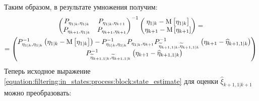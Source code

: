 Таким образом, в результате умножения получим:
\begin{multline*}
	\begin{pmatrix}
		P_{\eta_{1|k}, \eta_{1|k}} & P_{\eta_{1|k}, \eta_{k+1}} \\
		P_{\eta_{k+1}, \eta_{1|k}} & P_{\eta_{k+1}, \eta_{k+1}}
	\end{pmatrix}^{-1}
	\begin{pmatrix}
		\eta_{1|k} - \mathrm{M} \left [ \eta_{1|k} \right ] \\
		\eta_{k+1} - \mathrm{M} \left [ \eta_{k+1} \right ]
	\end{pmatrix}
	= \\
	=
	\begin{pmatrix}
		P_{\eta_{1|k},\eta_{1|k}}^{-1} \left ( \eta_{1|k} - \mathrm{M} \left [ \eta_{1|k} \right ] \right ) - P_{\eta_{1|k},\eta_{1|k}}^{-1} P_{\eta_{1|k}, \eta_{k+1}} P_{\widetilde{\eta}_{k+1, 1|k}, \widetilde{\eta}_{k+1, 1|k}}^{-1} \left ( \eta_{k+1} - \widehat{\eta}_{k+1, 1|k} \right ) \\
		P_{\widetilde{\eta}_{k+1, 1|k}, \widetilde{\eta}_{k+1, 1|k}}^{-1} \left ( \eta_{k+1} - \widehat{\eta}_{k+1, 1|k} \right )
	\end{pmatrix}
\end{multline*}
Теперь исходное выражение \eqref{equation:filtering:in_states:process:block:state_estimate} для оценки $\widehat{\xi}_{k+1,1|k+1}$ можно преобразовать:
